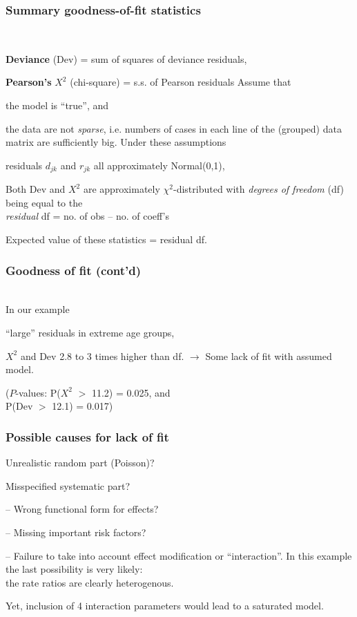 \documentclass[handout, 12pt]{beamer}
\begin{document}
\begin{frame}[fragile]
 \frametitle{Summary goodness-of-fit statistics}
\ \\ 
\bi
   \item {\bf Deviance} (Dev)  
         = sum of squares of deviance residuals,
   \item {\bf Pearson's} $X^2$ (chi-square) 
          = s.s. of Pearson residuals  
\ei
Assume that 
\bi
\item the model is ``true'', and 
\item the data are not {\it sparse}, i.e. numbers of cases in each line
      of the (grouped) data matrix are sufficiently big.
\ei
Under these assumptions 
\bi
\item  residuals $d_{jk}$ and $r_{jk}$ all approximately Normal(0,1),
\item  Both Dev and $X^2$ are approximately 
       $\chi^2$-distributed with 
       {\it degrees of freedom} (df) being equal to the \\
       {\it residual} df = no. of obs -- no. of coeff's 
\item Expected value of these statistics 
      = residual df.
\ei
\end{frame} 
\begin{frame}[fragile] \frametitle{Goodness of fit (cont'd)}
\ \\
In our example 
\bi
\item ``large'' residuals in extreme age groups,
\item $X^2$ and Dev 2.8 to 3 times higher than df.
\ei
$\rightarrow$ Some lack of fit with assumed model.

($P$-values: P($X^2$ $>$ 11.2) = 0.025, and \\
  P(Dev $>$ 12.1) = 0.017)
\end{frame} 
\begin{frame}[fragile]
 \frametitle{Possible causes for lack of fit}
\bi
\item Unrealistic random part (Poisson)?
\medskip
\item Misspecified systematic part?
      \bi
      \item[--] Wrong functional form for effects? \medskip
      \item[--] Missing important risk factors? \medskip
      \item[--] Failure to take into account {effect modification}
       or ``interaction''.
      \ei
\ei
In this example the last possibility is very likely:  \\ 
the rate ratios are clearly heterogenous. 

\medskip
Yet, inclusion of 4 interaction parameters
would lead to a saturated model.
\end{frame} 
\end{document}
